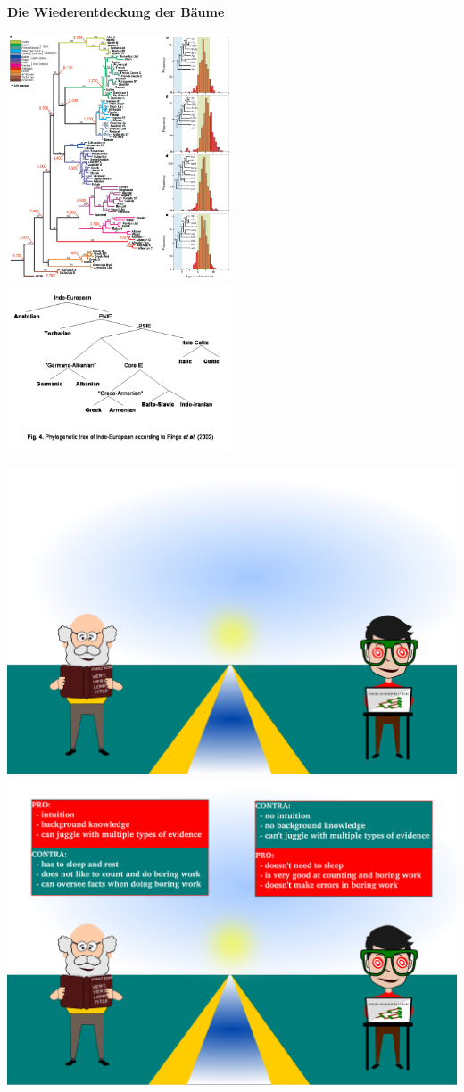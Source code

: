 \par\noindent\textbf{Die Wiederentdeckung der Bäume}

\includegraphics[width=0.5\textwidth]{img/gray.jpg}
\includegraphics[width=0.5\textwidth]{img/ringe.png}

\includegraphics[width=\textwidth]{img/bridging-1.png}
\includegraphics[width=\textwidth]{img/bridging-2.png}

